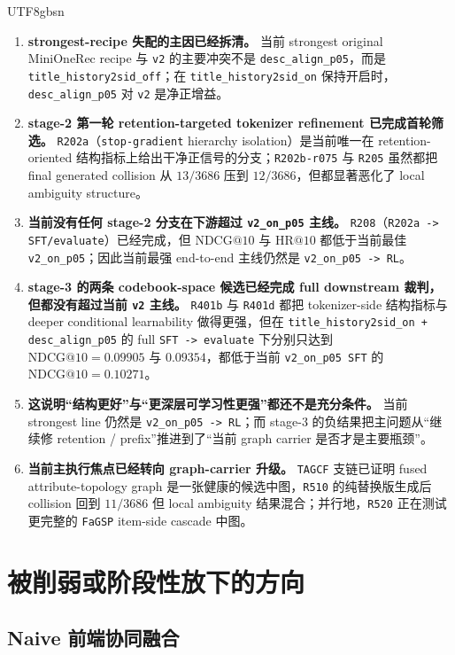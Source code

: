 \documentclass[11pt]{article}
\begin{document}
\begin{CJK*}{UTF8}{gbsn}
\begin{enumerate}
  \item \textbf{strongest-recipe 失配的主因已经拆清。} 当前 strongest original MiniOneRec recipe 与 \texttt{v2} 的主要冲突不是 \texttt{desc\_align\_p05}，而是 \texttt{title\_history2sid\_off}；在 \texttt{title\_history2sid\_on} 保持开启时，\texttt{desc\_align\_p05} 对 \texttt{v2} 是净正增益。
  \item \textbf{stage-2 第一轮 retention-targeted tokenizer refinement 已完成首轮筛选。} \texttt{R202a}（\texttt{stop-gradient} hierarchy isolation）是当前唯一在 retention-oriented 结构指标上给出干净正信号的分支；\texttt{R202b-r075} 与 \texttt{R205} 虽然都把 final generated collision 从 \(13/3686\) 压到 \(12/3686\)，但都显著恶化了 local ambiguity structure。
  \item \textbf{当前没有任何 stage-2 分支在下游超过 \texttt{v2\_on\_p05} 主线。} \texttt{R208}（\texttt{R202a -> SFT/evaluate}）已经完成，但 \(\mathrm{NDCG}@10\) 与 \(\mathrm{HR}@10\) 都低于当前最佳 \texttt{v2\_on\_p05}；因此当前最强 end-to-end 主线仍然是 \texttt{v2\_on\_p05 -> RL}。
  \item \textbf{stage-3 的两条 codebook-space 候选已经完成 full downstream 裁判，但都没有超过当前 \texttt{v2} 主线。} \texttt{R401b} 与 \texttt{R401d} 都把 tokenizer-side 结构指标与 deeper conditional learnability 做得更强，但在 \texttt{title\_history2sid\_on + desc\_align\_p05} 的 full \texttt{SFT -> evaluate} 下分别只达到 \(\mathrm{NDCG}@10 = 0.09905\) 与 \(0.09354\)，都低于当前 \texttt{v2\_on\_p05 SFT} 的 \(\mathrm{NDCG}@10 = 0.10271\)。
  \item \textbf{这说明“结构更好”与“更深层可学习性更强”都还不是充分条件。} 当前 strongest line 仍然是 \texttt{v2\_on\_p05 -> RL}；而 stage-3 的负结果把主问题从“继续修 retention / prefix”推进到了“当前 graph carrier 是否才是主要瓶颈”。
  \item \textbf{当前主执行焦点已经转向 graph-carrier 升级。} \texttt{TAGCF} 支链已证明 fused attribute-topology graph 是一张健康的候选中图，\texttt{R510} 的纯替换版生成后 collision 回到 \(11/3686\) 但 local ambiguity 结果混合；并行地，\texttt{R520} 正在测试更完整的 \texttt{FaGSP} item-side cascade 中图。
\end{enumerate}

\section{被削弱或阶段性放下的方向}

\subsection{Naive 前端协同融合}


\end{CJK*}
\end{document}
